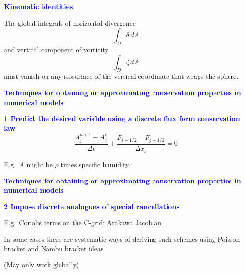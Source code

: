 \documentclass[a4]{seminar}
\newcommand{\B}[1]{\textcolor{blue}{#1}}
\begin{document}

\begin{slide}

\B{\bf Kinematic identities}

\vspace{2mm}

The global integrals of horizontal divergence
\begin{displaymath}
\int_{D} \delta \, dA
\end{displaymath}
and vertical component of vorticity
\begin{displaymath}
\int_{D} \zeta \, dA
\end{displaymath}
must vanish
on any isosurface of the vertical coordinate that wraps the sphere.


\end{slide}


\begin{slide}

\B{\bf Techniques for obtaining or approximating conservation
properties in numerical models}

\vspace{3mm}

\B{\bf 1 Predict the desired variable using a discrete 
flux form conservation law}
\begin{displaymath}
\frac{A_j^{n+1} - A_j^{n}}{\Delta t} + 
\frac{F_{j+1/2} - F_{j-1/2}}{\Delta x_j} = 0
\end{displaymath}


E.g.\ \( A \) might be \( \rho \) times specific humidity.



\end{slide}


\begin{slide}

\B{\bf Techniques for obtaining or approximating conservation
properties in numerical models}

\vspace{3mm}

\B{\bf 2 Impose discrete analogues of special cancellations}

\vspace{3mm}

E.g.\ Coriolis terms on the C-grid; Arakawa Jacobian

\vspace{3mm}

In some cases there are systematic ways of deriving such schemes
using Poisson bracket and Nambu bracket ideas

\vspace{3mm}

(May only work globally)


\end{slide}
\end{document}
